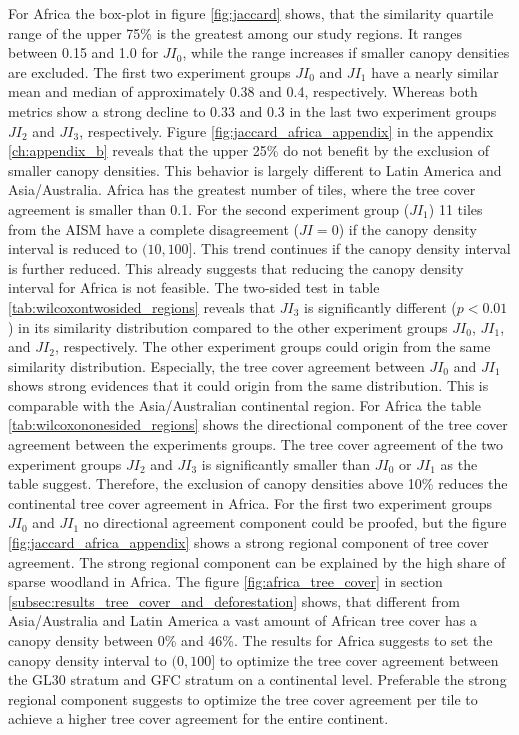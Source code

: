 			For Africa the box-plot in figure \ref{fig:jaccard} shows, that the similarity quartile range of the upper 75\% is the greatest among our study regions. It ranges between 0.15 and 1.0 for $JI_0$, while the range increases if smaller canopy densities are excluded. The first two experiment groups $JI_0$ and $JI_1$ have a nearly similar mean and median of approximately 0.38 and 0.4, respectively. Whereas both metrics show a strong decline to 0.33 and 0.3 in the last two experiment groups $JI_2$ and $JI_3$, respectively. Figure \ref{fig:jaccard_africa_appendix} in the appendix \ref{ch:appendix_b} reveals that the upper 25\% do not benefit by the exclusion of smaller canopy densities. This behavior is largely different to Latin America and Asia/Australia. Africa has the greatest number of tiles, where the tree cover agreement is smaller than 0.1. For the second experiment group ($JI_1$) 11 tiles from the \ac{AISM} have a complete disagreement ($JI=0$) if the canopy density interval is reduced to $(10,100]$. This trend continues if the canopy density interval is further reduced. This already suggests that reducing the canopy density interval for Africa is not feasible. The two-sided test in table \ref{tab:wilcoxontwosided_regions} reveals that $JI_3$ is significantly different ($p<0.01$) in its similarity distribution compared to the other experiment groups $JI_0$, $JI_1$, and $JI_2$, respectively. The other experiment groups could origin from the same similarity distribution. Especially, the tree cover agreement between $JI_0$ and $JI_1$ shows strong evidences that it could origin from the same distribution. This is comparable with the Asia/Australian continental region. For Africa the table \ref{tab:wilcoxononesided_regions} shows the directional component of the tree cover agreement between the experiments groups. The tree cover agreement of the two experiment groups $JI_2$ and $JI_3$ is significantly smaller than $JI_0$ or $JI_1$ as the table suggest. Therefore, the exclusion of canopy densities above 10\% reduces the continental tree cover agreement in Africa. For the first two experiment groups $JI_0$ and $JI_1$ no directional agreement component could be proofed, but the figure \ref{fig:jaccard_africa_appendix} shows a strong regional component of tree cover agreement. The strong regional component can be explained by the high share of sparse woodland in Africa. The figure \ref{fig:africa_tree_cover} in section \ref{subsec:results_tree_cover_and_deforestation} shows, that different from Asia/Australia and Latin America a vast amount of African tree cover has a canopy density between 0\% and 46\%. The results for Africa suggests to set the canopy density interval to $(0,100]$ to optimize the tree cover agreement between the \ac{GL30} stratum and \ac{GFC} stratum on a continental level. Preferable the strong regional component suggests to optimize the tree cover agreement per tile to achieve a higher tree cover agreement for the entire continent.


